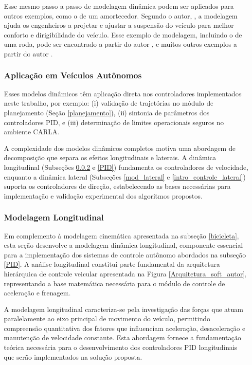 Esse mesmo passo a passo de modelagem dinâmica podem ser aplicados para outros exemplos, como o de um amortecedor. Segundo o autor, , a modelagem ajuda os engenheiros a projetar e ajustar a suspensão do veículo para melhor conforto e dirigibilidade do veículo. Esse exemplo de modelagem, incluindo o de uma roda, pode ser encontrado a partir do autor \cite[Week 4 - Lesson 3: Dynamic Modeling in 2D. ~4min41s]{University_of_Toronto2018-fe}, e muitos outros exemplos a partir do autor .

\subsubsection{Aplicação em Veículos Autônomos}

Esses modelos dinâmicos têm aplicação direta nos controladores implementados neste trabalho, por exemplo: (i) validação de trajetórias no módulo de planejamento (Seção \ref{planejamento}), (ii) sintonia de parâmetros dos controladores PID, e (iii) determinação de limites operacionais seguros no ambiente CARLA.

A complexidade dos modelos dinâmicos completos motiva uma abordagem de decomposição que separa os efeitos longitudinais e laterais. A dinâmica longitudinal (Subseções \ref{mod_longitudinal} e \ref{PID}) fundamenta os controladores de velocidade, enquanto a dinâmica lateral (Subseções \ref{mod_lateral} e \ref{intro_controle_lateral}) suporta os controladores de direção, estabelecendo as bases necessárias para implementação e validação experimental dos algoritmos propostos.

\subsubsection{Modelagem Longitudinal} \label{mod_longitudinal}

Em complemento à modelagem cinemática apresentada na subseção \ref{bicicleta}, esta seção desenvolve a modelagem dinâmica longitudinal, componente essencial para a implementação dos sistemas de controle autônomo abordados na subseção \ref{PID}. A análise longitudinal constitui parte fundamental da arquitetura hierárquica de controle veicular apresentada na Figura \ref{Arquitetura_soft_autor}, representando a base matemática necessária para o módulo de controle de aceleração e frenagem.

A modelagem longitudinal caracteriza-se pela investigação das forças que atuam paralelamente ao eixo principal de movimento do veículo, permitindo compreensão quantitativa dos fatores que influenciam aceleração, desaceleração e manutenção de velocidade constante. Esta abordagem fornece a fundamentação teórica necessária para o desenvolvimento dos controladores PID longitudinais que serão implementados na solução proposta.

